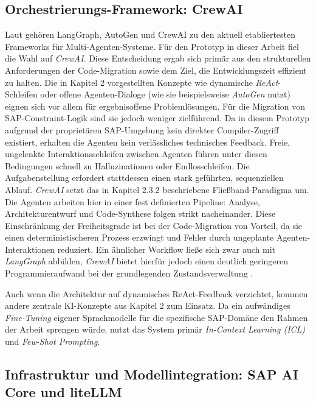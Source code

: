 \subsection{Orchestrierungs-Framework: CrewAI}
\label{subsec:auswahl_crewai}
Laut \textcite{liuLargescaleStudyDevelopment2025} gehören LangGraph, AutoGen und CrewAI zu den aktuell etabliertesten Frameworks für Multi-Agenten-Systeme. Für den Prototyp in dieser Arbeit fiel die Wahl auf \textit{CrewAI}. Diese Entscheidung ergab sich primär aus den strukturellen Anforderungen der Code-Migration sowie dem Ziel, die Entwicklungszeit effizient zu halten.  Die in Kapitel 2 vorgestellten Konzepte wie dynamische \textit{ReAct}-Schleifen oder offene Agenten-Dialoge (wie sie beispielsweise \textit{AutoGen} nutzt) eignen sich vor allem für ergebnisoffene Problemlösungen. 
Für die Migration von SAP-Constraint-Logik sind sie jedoch weniger zielführend. Da in diesem Prototyp aufgrund der proprietären SAP-Umgebung kein direkter Compiler-Zugriff existiert, erhalten die Agenten kein verlässliches technisches Feedback. Freie, ungelenkte Interaktionsschleifen zwischen Agenten führen unter diesen Bedingungen schnell zu Halluzinationen oder Endlosschleifen.  Die Aufgabenstellung erfordert stattdessen einen stark geführten, sequenziellen Ablauf. \textit{CrewAI} setzt das in Kapitel 2.3.2 beschriebene \glqq Fließband-Paradigma\grqq{} um. Die Agenten arbeiten hier in einer fest definierten Pipeline: Analyse, Architekturentwurf und Code-Synthese folgen strikt nacheinander. Diese Einschränkung der Freiheitsgrade ist bei der Code-Migration von Vorteil, da sie einen deterministischeren Prozess erzwingt und Fehler durch ungeplante Agenten-Interaktionen reduziert. Ein ähnlicher Workflow ließe sich zwar auch mit \textit{LangGraph} abbilden, \textit{CrewAI} bietet hierfür jedoch einen deutlich geringeren Programmieraufwand bei der grundlegenden Zustandsverwaltung \parencite{liuLargescaleStudyDevelopment2025}.  

Auch wenn die Architektur auf dynamisches ReAct-Feedback verzichtet, kommen andere zentrale KI-Konzepte aus Kapitel 2 zum Einsatz. Da ein aufwändiges \textit{Fine-Tuning} eigener Sprachmodelle für die spezifische SAP-Domäne den Rahmen der Arbeit sprengen würde, nutzt das System primär \textit{In-Context Learning (\ac{ICL})} und \textit{Few-Shot Prompting}.
\subsection{Infrastruktur und Modellintegration: SAP AI Core und liteLLM}
\label{subsec:infrastruktur_modellintegration}

